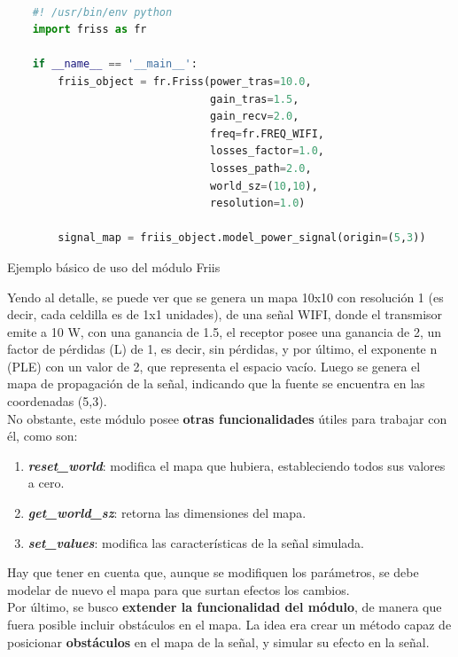 \begin{code}[H]
    \begin{lstlisting}[language=Python]

    #! /usr/bin/env python
    import friss as fr

    if __name__ == '__main__':
        friis_object = fr.Friss(power_tras=10.0,
                                gain_tras=1.5,
                                gain_recv=2.0,
                                freq=fr.FREQ_WIFI,
                                losses_factor=1.0,
                                losses_path=2.0,
                                world_sz=(10,10),
                                resolution=1.0)

        signal_map = friis_object.model_power_signal(origin=(5,3))

\end{lstlisting}
\caption[Ejemplo básico de uso del módulo Friis]{Ejemplo básico de uso del módulo Friis}
\label{cod:friis_basics}
\end{code}

Yendo al detalle, se puede ver que se genera un mapa 10x10 con resolución 1 (es decir, cada celdilla es de 1x1 unidades), de una señal WIFI, donde el transmisor emite a 10 W, con una ganancia de 1.5, el receptor posee una ganancia de 2, un factor de pérdidas (L) de 1, es decir, sin pérdidas, y por último, el exponente n (\ac{PLE}) con un valor de 2, que representa el espacio vacío. Luego se genera el mapa de propagación de la señal, indicando que la fuente se encuentra en las coordenadas (5,3).\\

No obstante, este módulo posee \textbf{otras funcionalidades} útiles para trabajar con él, como son:

\begin{enumerate}
    \item \textbf{\emph{reset\_world}}: modifica el mapa que hubiera, estableciendo todos sus valores a cero.

    \item \textbf{\emph{get\_world\_sz}}: retorna las dimensiones del mapa.

    \item \textbf{\emph{set\_values}}: modifica las características de la señal simulada.
\end{enumerate}

Hay que tener en cuenta que, aunque se modifiquen los parámetros, se debe modelar de nuevo el mapa para que surtan efectos los cambios.\\
\newpage
Por último, se busco \textbf{extender la funcionalidad del módulo}, de manera que fuera posible incluir obstáculos en el mapa. La idea era crear un método capaz de posicionar \textbf{obstáculos} en el mapa de la señal, y simular su efecto en la señal.\\

